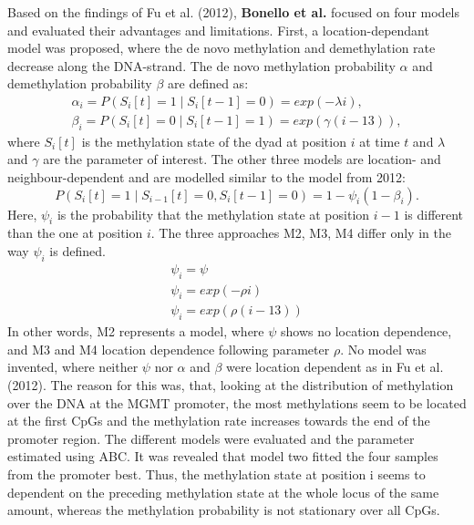 Based on the findings of Fu et al. (2012), \textbf{Bonello et al.}\cite{Bonello} focused on four models and evaluated their advantages and limitations.\newline
First, a location-dependant model was proposed, where the de novo methylation and demethylation rate decrease along the DNA-strand. The de novo methylation probability $\alpha$ and demethylation probability $\beta$ are defined as:
\begin{align}
\alpha_i = P(S_i[t] = 1 \mid S_i[t-1] = 0) = exp(-\lambda i),\\
\beta_i = P(S_i[t] = 0 \mid S_i[t-1] = 1) = exp(\gamma (i-13)),
\end{align}
where $S_i[t]$ is the methylation state of the dyad at position $i$ at time $t$ and $\lambda$ and $\gamma$ are the parameter of interest.\newline
The other three models are location- and neighbour-dependent and are modelled similar to the model from 2012:
\begin{equation}
P(S_i[t] = 1 \mid S_{i-1}[t] = 0, S_i[t-1] = 0) = 1-\psi_i (1-\beta_i).
\end{equation}
Here, $\psi_i$ is the probability that the methylation state at position $i-1$ is different than the one at position $i$. The three approaches M2, M3, M4 differ only in the way $\psi_i$ is defined.
\begin{align}
\psi_i = \psi\\
\psi_i = exp(-\rho i)\\
\psi_i = exp(\rho (i-13))
\end{align}
In other words, M2 represents a model, where $\psi$ shows no location dependence, and M3 and M4 location dependence following parameter $\rho$. No model was invented, where neither $\psi$ nor $\alpha$ and $\beta$ were location dependent as in Fu et al.(2012). The reason for this was, that, looking at the distribution of methylation over the DNA at the \ac{MGMT} promoter, the most methylations seem to be located at the first \acp{CpG} and the methylation rate increases towards the end of the promoter region.\newline
The different models were evaluated and the parameter estimated using \ac{ABC}. It was revealed that model two fitted the four samples from the promoter best. Thus, the methylation state at position i seems to dependent on the preceding methylation state at the whole locus of the same amount, whereas the methylation probability is not stationary over all \acp{CpG}\cite{Bonello}.\\

